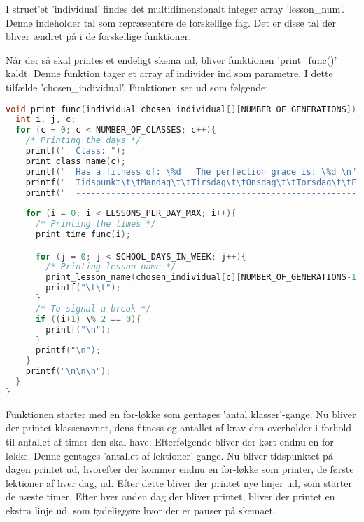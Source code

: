 I struct’et ’individual’ findes det multidimensionalt integer array ’lesson\_num’. Denne indeholder tal som repræsentere de forskellige fag. Det er disse tal der bliver ændret på i de forskellige funktioner. 

Når der så skal printes et endeligt skema ud, bliver funktionen ’print\_func()’ kaldt. Denne funktion tager et array af individer ind som parametre. I dette tilfælde ’chosen\_individual’. Funktionen ser ud som følgende:
\begin{lstlisting}[language = C]
void print_func(individual chosen_individual[][NUMBER_OF_GENERATIONS]){
  int i, j, c;
  for (c = 0; c < NUMBER_OF_CLASSES; c++){
    /* Printing the days */
    printf("  Class: ");
    print_class_name(c);
    printf("  Has a fitness of: \%d   The perfection grade is: \%d \n", chosen_individual[c][NUMBER_OF_GENERATIONS-1].fitness, chosen_individual[c][NUMBER_OF_GENERATIONS].perfection);
    printf("  Tidspunkt\t\tMandag\t\tTirsdag\t\tOnsdag\t\tTorsdag\t\tFredag\n");
    printf("  ------------------------------------------------------------------------------------------------\n");
    
    for (i = 0; i < LESSONS_PER_DAY_MAX; i++){
      /* Printing the times */
      print_time_func(i);

      for (j = 0; j < SCHOOL_DAYS_IN_WEEK; j++){
        /* Printing lesson name */
        print_lesson_name(chosen_individual[c][NUMBER_OF_GENERATIONS-1].lesson_num[j][i]);
        printf("\t\t");
      }
      /* To signal a break */
      if ((i+1) \% 2 == 0){
        printf("\n");
      }
      printf("\n");
    }
    printf("\n\n\n");
  }
}
\end{lstlisting}

Funktionen starter med en for-løkke som gentages ’antal klasser’-gange. Nu bliver der printet klassenavnet, dens fitness og antallet af krav den overholder i forhold til antallet af timer den skal have. 
Efterfølgende bliver der kørt endnu en for-løkke. Denne gentages ’antallet af lektioner’-gange. Nu bliver tidspunktet på dagen printet ud, hvorefter der kommer endnu en for-løkke som printer, de første lektioner af hver dag, ud. 
Efter dette bliver der printet nye linjer ud, som starter de næste timer. Efter hver anden dag der bliver printet, bliver der printet en ekstra linje ud, som tydeliggøre hvor der er pauser på skemaet.
